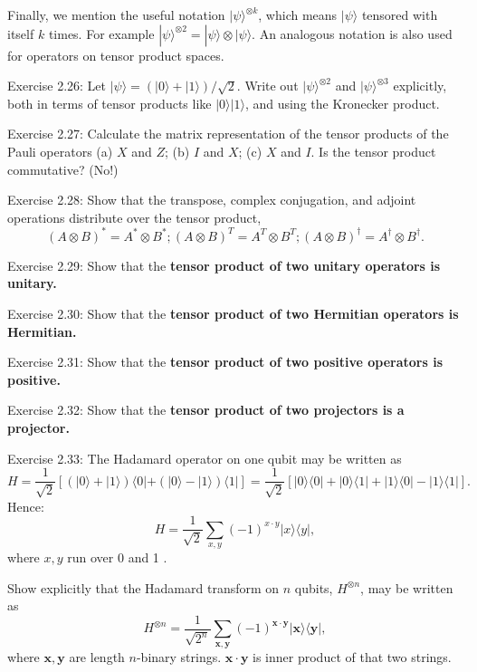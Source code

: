 Finally, we mention the useful notation $|\psi\rangle^{\otimes k}$, which means $|\psi\rangle$ tensored with itself $k$ times. For example $|\psi\rangle^{\otimes 2}=|\psi\rangle \otimes|\psi\rangle$. An analogous notation is also used for operators on tensor product spaces.

Exercise 2.26: Let $|\psi\rangle=(|0\rangle+|1\rangle) / \sqrt{2}$. Write out $|\psi\rangle^{\otimes 2}$ and $|\psi\rangle^{\otimes 3}$ explicitly, both in terms of tensor products like $|0\rangle|1\rangle$, and using the Kronecker product.

Exercise 2.27: Calculate the matrix representation of the tensor products of the Pauli operators (a) $X$ and $Z$; (b) $I$ and $X$; (c) $X$ and $I$. Is the tensor product commutative? (No!)

Exercise 2.28: Show that the transpose, complex conjugation, and adjoint operations distribute over the tensor product,
\begin{equation}
    (A \otimes B)^{*}=A^{*} \otimes B^{*} ;(A \otimes B)^{T}=A^{T} \otimes B^{T} ;(A \otimes B)^{\dagger}=A^{\dagger} \otimes B^{\dagger} .
\end{equation}

Exercise 2.29: Show that the \textbf{tensor product of two unitary operators is unitary.}

Exercise 2.30: Show that the\textbf{ tensor product of two Hermitian operators is Hermitian.}

Exercise 2.31: Show that the\textbf{ tensor product of two positive operators is positive.}

Exercise 2.32: Show that the \textbf{tensor product of two projectors is a projector.}

Exercise 2.33: The Hadamard operator on one qubit may be written as
\begin{equation}
    H
=\frac{1}{\sqrt{2}}[(|0\rangle+|1\rangle)\langle 0|+(|0\rangle-|1\rangle)\langle 1|]
=\frac{1}{\sqrt{2}}[|0\rangle\langle 0|+| 0\rangle\langle 1|+| 1\rangle\langle 0|-| 1\rangle\langle 1|].
\end{equation}
Hence:
\begin{equation}
    H=\frac{1}{\sqrt{2}} \sum_{x, y}(-1)^{x \cdot y}|x\rangle\langle y|,
\end{equation}
where $x, y$ run over 0 and 1 .

Show explicitly that the Hadamard transform on $n$ qubits, $H^{\otimes n}$, may be written as
\begin{equation}
    H^{\otimes n}
=\frac{1}{\sqrt{2^n}} \sum_{\mathbf{x}, \mathbf{y}}(-1)^{\mathbf{x} \cdot \mathbf{y}}|\mathbf{x}\rangle\langle\mathbf{y}|,
\end{equation}
where $\mathbf{x}, \mathbf{y}$ are length $n$-binary strings. $\mathbf{x} \cdot \mathbf{y}$ is inner product of that two strings.

